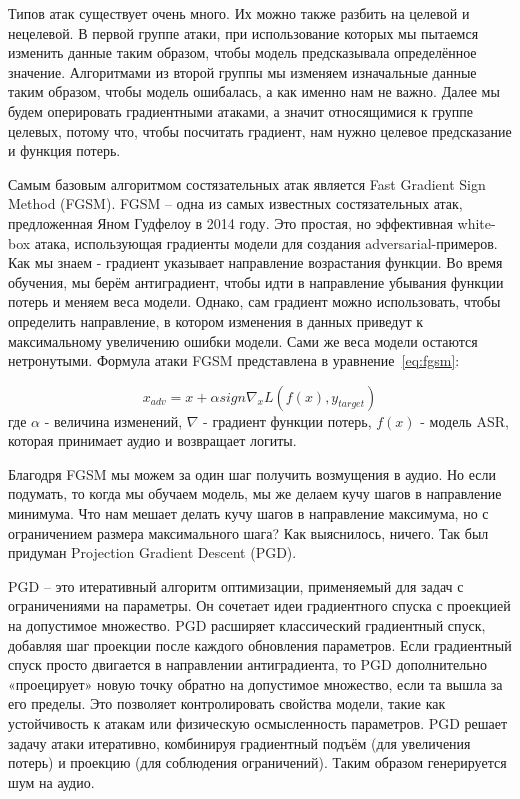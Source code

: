 Типов атак существует очень много.
Их можно также разбить на целевой и нецелевой.
В первой группе атаки, при использование которых мы пытаемся изменить данные таким образом, чтобы модель предсказывала определённое значение.
Алгоритмами из второй группы мы изменяем изначальные данные таким образом, чтобы модель ошибалась, а как именно нам не важно.
Далее мы будем оперировать градиентными атаками, а значит относящимися к группе целевых, потому что, чтобы посчитать градиент, нам нужно целевое предсказание и функция потерь.

Самым базовым алгоритмом состязательных атак является Fast Gradient Sign Method (FGSM).
FGSM -- одна из самых известных состязательных атак, предложенная Яном Гудфелоу в 2014 году\cite{goodfellow2014explaining}.
Это простая, но эффективная white-box атака, использующая градиенты модели для создания adversarial-примеров.
Как мы знаем - градиент указывает направление возрастания функции.
Во время обучения, мы берём антиградиент, чтобы идти в направление убывания функции потерь и меняем веса модели.
Однако, сам градиент можно использовать, чтобы определить направление, в котором изменения в данных приведут к максимальному увеличению ошибки модели.
Сами же веса модели остаются нетронутыми.
Формула атаки FGSM представлена в уравнение~\ref{eq:fgsm}:

\begin{equation}
  x_{adv} = x + \alpha sign \nabla_x L(f(x), y_{target})
  \label{eq:fgsm}
\end{equation}
где $\alpha$ - величина изменений, $\nabla$ - градиент функции потерь, $f(x)$ - модель ASR, которая принимает аудио и возвращает логиты.

Благодря FGSM мы можем за один шаг получить возмущения в аудио.
Но если подумать, то когда мы обучаем модель, мы же делаем кучу шагов в направление минимума.
Что нам мешает делать кучу шагов в направление максимума, но с ограничением размера максимального шага?
Как выяснилось, ничего.
Так был придуман Projection Gradient Descent (PGD)\cite{madry2017towards}.

PGD -- это итеративный алгоритм оптимизации, применяемый для задач с ограничениями на параметры.
Он сочетает идеи градиентного спуска с проекцией на допустимое множество.
PGD расширяет классический градиентный спуск, добавляя шаг проекции после каждого обновления параметров.
Если градиентный спуск просто двигается в направлении антиградиента, то PGD дополнительно «проецирует» новую точку обратно на допустимое множество, если та вышла за его пределы.
Это позволяет контролировать свойства модели, такие как устойчивость к атакам или физическую осмысленность параметров.
PGD решает задачу атаки итеративно, комбинируя градиентный подъём (для увеличения потерь) и проекцию (для соблюдения ограничений).
Таким образом генерируется шум на аудио.

